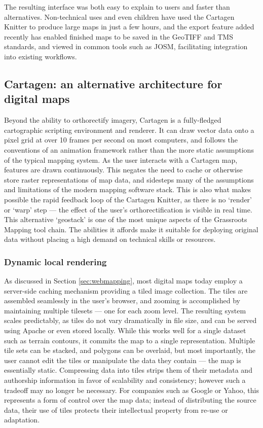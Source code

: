 \documentclass[11pt,oneside,notitlepage]{report}
\begin{document}
The resulting interface was both easy to explain to users and faster than alternatives. Non-technical uses and even children have used the Cartagen Knitter to produce large maps in just a few hours, and the export feature added recently has enabled finished maps to be saved in the \ac{GeoTIFF} and \ac{TMS} standards, and viewed in common tools such as \ac{JOSM}, facilitating integration into existing workflows. 

\subsection{Cartagen: an alternative architecture for digital maps}

Beyond the ability to orthorectify imagery, Cartagen is a fully-fledged cartographic scripting environment and renderer. It can draw vector data onto a pixel grid at over 10 frames per second on most computers, and follows the conventions of an animation framework rather than the more static assumptions of the typical mapping system. As the user interacts with a Cartagen map, features are drawn continuously. This negates the need to cache or otherwise store raster representations of map data, and sidesteps many of the assumptions and limitations of the modern mapping software stack. This is also what makes possible the rapid feedback loop of the Cartagen Knitter, as there is no `render' or `warp' step --- the effect of the user's orthorectification is visible in real time. This alternative `geostack' is one of the most unique aspects of the Grassroots Mapping tool chain. The abilities it affords make it suitable for deploying original data without placing a high demand on technical skills or resources. 

\subsubsection{Dynamic local rendering}

As discussed in Section \ref{sec:webmapping}, most digital maps today employ a server-side caching mechanism providing a tiled image collection. The tiles are assembled seamlessly in the user's browser, and zooming is accomplished by maintaining multiple tilesets --- one for each zoom level. The resulting system scales predictably, as tiles do not vary dramatically in file size, and can be served using Apache or even stored locally. While this works well for a single dataset such as terrain contours, it commits the map to a single representation. Multiple tile sets can be stacked, and polygons can be overlaid, but most importantly, the user cannot edit the tiles or manipulate the data they contain --- the map is essentially static. Compressing data into tiles strips them of their metadata and authorship information in favor of scalability and consistency; however such a tradeoff may no longer be necessary. For companies such as Google or Yahoo, this represents a form of control over the map data; instead of distributing the source data, their use of tiles protects their intellectual property from re-use or adaptation.  
\end{document}
